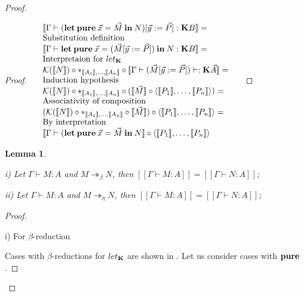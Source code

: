 \documentclass[a4paper]{article}
\newtheorem{lemma}{Lemma}
\begin{document}
\begin{proof}
\begin{proof}
\vspace{\baselineskip}

$\begin{array}{lll}
&[\![\Gamma \vdash ({\bf let \: pure} \: \vec{x} = \vec{M} {\: \bf in \:} N) [\vec{y} := \vec{P}] : {\bf K} B]\!] =& \\
&\text{Substitution definition}& \\
&[\![\Gamma \vdash {\bf let \: pure} \: \vec{x} = (\vec{M} [\vec{y} := \vec{P}]) {\: \bf in \:} N : {\bf K}B]\!] =& \\
&\text{Interpretaion for $let_{\bf K}$}& \\
&\mathcal{K}([\![N]\!]) \circ \ast_{[\![A_1]\!],\dots,[\![A_n]\!]} \circ [\![\Gamma \vdash (\vec{M} [\vec{y} := \vec{P}]) \vdash : {\bf K}\vec{A}]\!] =& \\
&\text{Induction hypothesis}& \\
&\mathcal{K}([\![N]\!]) \circ \ast_{[\![A_1]\!],\dots,[\![A_n]\!]} \circ ([\![\vec{M}]\!] \circ \langle [\![P_1]\!],\dots,[\![P_n]\!]\rangle) = & \\
&\text{Associativity of composition}& \\
&(\mathcal{K}([\![N]\!]) \circ \ast_{[\![A_1]\!],\dots,[\![A_n]\!]} \circ [\![\vec{M}]\!]) \circ \langle [\![P_1]\!],\dots,[\![P_n]\!]\rangle = & \\
&\text{By interpretation}&\\
&[\![\Gamma \vdash ({\bf let \: pure} \: \vec{x} = \vec{M} {\: \bf in \:} N]\!] \circ \langle [\![P_1]\!],\dots,[\![P_n]\!]\rangle&
\end{array}$

\end{proof}

\begin{lemma}
  $ $

  i) Let $\Gamma \vdash M : A$ and $M \twoheadrightarrow_{\beta} N$, then $[\![\Gamma \vdash M : A]\!] = [\![\Gamma \vdash N : A]\!]$;

  ii) Let $\Gamma \vdash M : A$ and $M \twoheadrightarrow_{\eta} N$, then $[\![\Gamma \vdash M : A]\!] = [\![\Gamma \vdash N : A]\!]$;
\end{lemma}

\begin{proof}
  $ $

  i) For $\beta$-reduction

\vspace{\baselineskip}

Cases with $\beta$-reductions for $let_{\bf K}$ are shown in \cite{ModalK1}. Let us consider cases with ${\bf pure}$.


\end{proof}
\end{proof}
\end{document}

